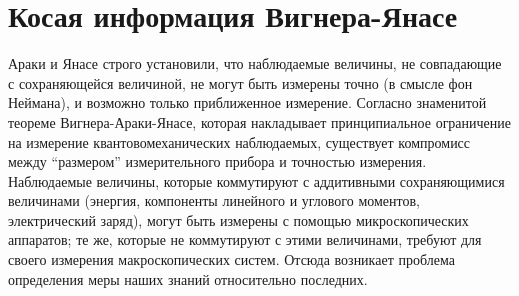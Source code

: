\section{Косая информация Вигнера-Янасе}


% 

Араки и Янасе строго установили, что наблюдаемые величины, 
не совпадающие с сохраняющейся величиной, 
не могут быть измерены точно (в смысле фон Неймана), 
и возможно только приближенное измерение. 
Согласно знаменитой теореме Вигнера-Араки-Янасе, которая накладывает принципиальное ограничение на измерение квантовомеханических наблюдаемых,
существует компромисс между ``размером'' измерительного прибора и точностью измерения\cite{Araki1961, Ozawa1991, Ozawa2002a, Ozawa2002b, Matsumoto1993, Kakazu3469}.
Наблюдаемые величины, 
которые коммутируют с аддитивными сохраняющимися величинами 
(энергия, компоненты линейного и углового моментов, электрический заряд), 
могут быть измерены с помощью микроскопических аппаратов; 
те же, которые не коммутируют с этими величинами, требуют для своего измерения макроскопических систем\cite{Wigner1960}.
Отсюда возникает проблема определения меры наших знаний относительно последних. 


